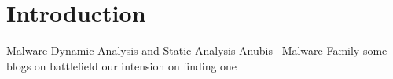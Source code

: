 \chapter{Introduction}\label{chapter:introduction}
	Malware
	Dynamic Analysis and Static Analysis
	Anubis~\cite{anubis}
	Malware Family
	some blogs on battlefield
	our intension on finding one
